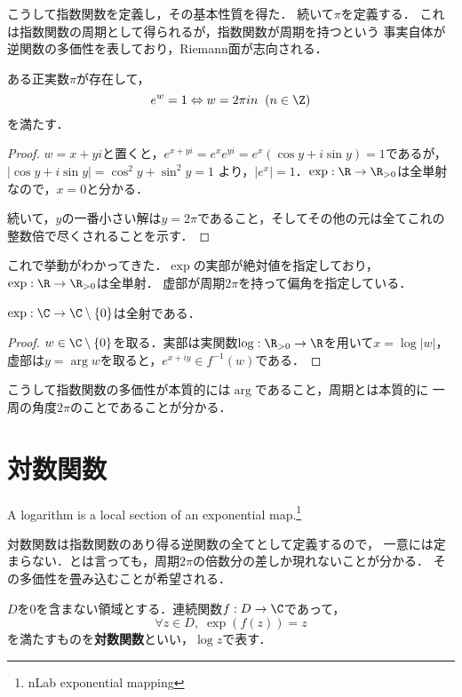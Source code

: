 \documentclass[uplatex, dvipdfmx]{jsreport}
\begin{document}
こうして指数関数を定義し，その基本性質を得た．
続いて$\pi$を定義する．
これは指数関数の周期として得られるが，指数関数が周期を持つという
事実自体が逆関数の多価性を表しており，Riemann面が志向される．

\begin{theorem}[period]\label{thm-period-of-exponential}
    ある正実数$\pi$が存在して，
    \[ e^w=1\Leftrightarrow w=2\pi in\;\;(n\in\Z) \]
    を満たす．
\end{theorem}
\begin{proof}\mbox{}
    $w=x+yi$と置くと，$e^{x+yi}=e^xe^{yi}=e^x(\cos y+i\sin y)=1$であるが，$|\cos y+i\sin y|=\cos^2y+\sin^2y=1$
    より，$|e^x|=1$．$\exp:\R\to\R_{>0}$は全単射なので，$x=0$と分かる．

    続いて，$y$の一番小さい解は$y=2\pi$であること，そしてその他の元は全てこれの整数倍で尽くされることを示す．
\end{proof}

これで挙動がわかってきた．$\exp$の実部が絶対値を指定しており，$\exp:\R\to\R_{>0}$は全単射．
虚部が周期$2\pi$を持って偏角を指定している．

\begin{theorem}
    $\exp:\C\to\C\setminus\{0\}$は全射である．
\end{theorem}
\begin{proof}
    $w\in\C\setminus\{0\}$を取る．実部は実関数$\log:\R_{>0}\to\R$を用いて$x=\log|w|$，
    虚部は$y=\arg w$を取ると，$e^{x+iy}\in f^{-1}(w)$である．
\end{proof}

こうして指数関数の多価性が本質的には$\arg$であること，周期とは本質的に
一周の角度$2\pi$のことであることが分かる．

\section{対数関数}

\begin{screen}
    A logarithm is a local section of an exponential map.\footnote{nLab exponential mapping}

    対数関数は指数関数のあり得る逆関数の全てとして定義するので，
    一意には定まらない．とは言っても，周期$2\pi$の倍数分の差しか現れないことが分かる．
    その多価性を畳み込むことが希望される．
\end{screen}

\begin{definition}[logarithm]
    $D$を$0$を含まない領域とする．連続関数$f:D\to\C$であって，
    \[ \forall z\in D,\; \exp(f(z))=z \]
    を満たすものを\textbf{対数関数}といい，$\log z$で表す．
\end{definition}
\end{document}
